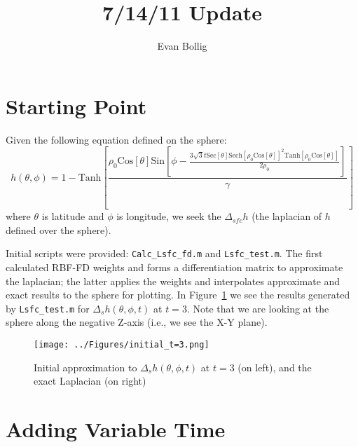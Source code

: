 \documentclass[letter,10pt]{article}
\title{7/14/11 Update}
\author{Evan Bollig}
\begin{document}
\maketitle

\tableofcontents

\section{Starting Point} 

Given the following equation defined on the sphere: 
\begin{equation*} 
h(\theta, \phi) = 1-\text{Tanh}\left[\frac{\rho_{0} \text{Cos}[\theta] \text{Sin}\left[\phi-\frac{3 \sqrt{3} t \text{Sec}[\theta] \text{Sech}[\rho_{0} \text{Cos}[\theta]]^2 \text{Tanh}[\rho_{0} \text{Cos}[\theta]]}{2 \rho_{0}}\right]}{\gamma}\right]
\end{equation*} 
where $\theta$ is latitude and $\phi$ is longitude, we seek the $\Delta_{sfc} h$ (the laplacian of $h$ defined over the sphere). 

Initial scripts were provided: \verb|Calc_Lsfc_fd.m| and \verb|Lsfc_test.m|. The first calculated RBF-FD weights and forms a differentiation matrix to approximate the laplacian; the latter applies the weights and interpolates approximate and exact results to the sphere for plotting. In Figure~\ref{fig:initial_t=3} we see the results generated by \verb|Lsfc_test.m| for $\Delta_{s} h(\theta,\phi,t)$ at $t=3$. Note that we are looking at the sphere along the negative Z-axis (i.e., we see the X-Y plane).

\begin{figure}[h]
\begin{center}
\texttt{[image: ../Figures/initial\_t=3.png]}
\caption{Initial approximation to $\Delta_{s} h(\theta,\phi,t)$ at $t=3$ (on left), and the exact Laplacian (on right)}
\label{fig:initial_t=3}
\end{center}
\end{figure}
\clearpage

\section{Adding Variable Time}
\end{document}
